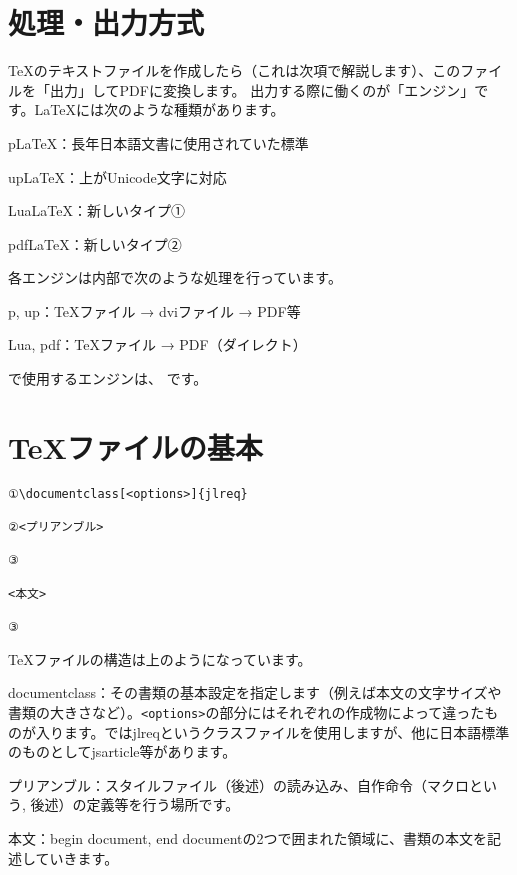 \begin{multicols*}{2}
\section{処理・出力方式}
\TeX のテキストファイルを作成したら（これは次項で解説します）、このファイルを「出力」してPDFに変換します。
出力する際に働くのが「エンジン」です。\LaTeX には次のような種類があります。
\begin{reitemize}
    \item p\LaTeX ：長年日本語文書に使用されていた標準
    \item up\LaTeX ：上がUnicode文字に対応
    \item Lua\LaTeX ：新しいタイプ①
    \item pdf\LaTeX ：新しいタイプ②
\end{reitemize}
\vspace{1\zw}
各エンジンは内部で次のような処理を行っています。
\begin{reitemize}
    \item p, up：\TeX ファイル → dviファイル → PDF等
    \item Lua, pdf：\TeX ファイル → PDF（ダイレクト）
\end{reitemize}
\BunTeX で使用するエンジンは、 です。

\section{\TeX ファイルの基本}
\begin{verbatim}
①\documentclass[<options>]{jlreq}

②<プリアンブル>

③
    
<本文>

③
\end{verbatim}
\vspace{1\zw}
\TeX ファイルの構造は上のようになっています。
\begin{enumcircle}
    \item documentclass：その書類の基本設定を指定します（例えば本文の文字サイズや書類の大きさなど）。\verb|<options>|の部分にはそれぞれの作成物によって違ったものが入ります。\BunTeX ではjlreqというクラスファイルを使用しますが、他に日本語標準のものとしてjsarticle等があります。
    \item プリアンブル：スタイルファイル（後述）の読み込み、自作命令（マクロという, 後述）の定義等を行う場所です。
    \item 本文：begin document, end documentの2つで囲まれた領域に、書類の本文を記述していきます。
\end{enumcircle}


\end{multicols*}
